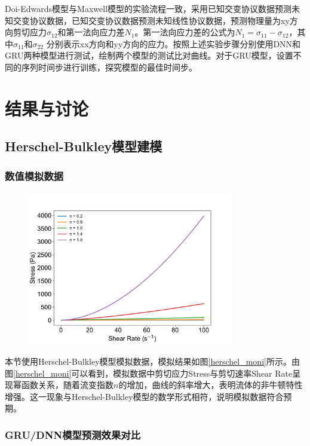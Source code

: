 Doi-Edwards模型与Maxwell模型的实验流程一致，采用已知交变协议数据预测未知交变协议数据，已知交变协议数据预测未知线性协议数据，预测物理量为xy方向剪切应力$\sigma_{12}$和第一法向应力差$N_1$。第一法向应力差的公式为$N_1=\sigma_{11}-\sigma_{12} $，其中$\sigma_{11}$和$\sigma_{22}$ 分别表示xx方向和yy方向的应力。按照上述实验步骤分别使用DNN和GRU两种模型进行测试，绘制两个模型的测试比对曲线。对于GRU模型，设置不同的序列时间步进行训练，探究模型的最佳时间步。

\section{结果与讨论}
\subsection{Herschel-Bulkley模型建模}
\subsubsection{数值模拟数据}
\begin{figure}[htbp]
  \centering
  \includegraphics[width=0.8\textwidth]{Fig/herschel_moni.pdf}
\end{figure}
本节使用Herschel-Bulkley模型模拟数据，模拟结果如图\ref{herschel_moni}所示。由图\ref{herschel_moni}可以看到，模拟数据中剪切应力Stress与剪切速率Shear Rate呈现幂函数关系，随着流变指数$n$的增加，曲线的斜率增大，表明流体的非牛顿特性增强。这一现象与Herschel-Bulkley模型的数学形式相符，说明模拟数据符合预期。
\subsubsection{GRU/DNN模型预测效果对比}

